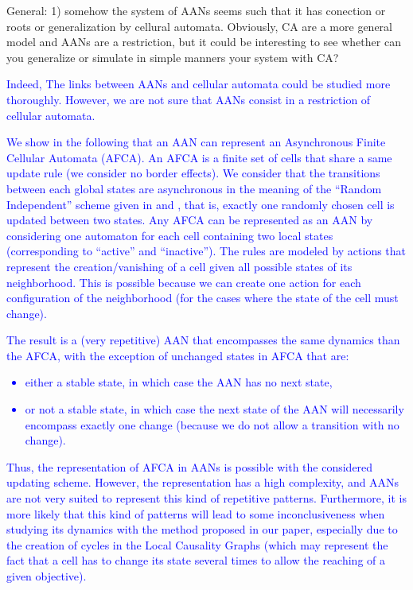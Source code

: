\documentclass[11pt]{article}
\newcommand{\ilanswer}[1]{\textcolor{blue}{#1}}
\begin{document}
General: 1) somehow the system of AANs seems such that it has conection or roots or generalization by cellural automata. Obviously, CA are a more general model and AANs are a restriction, but it could be interesting to see whether can you generalize or simulate in simple manners your system with CA?

\ilanswer{Indeed, The links between AANs and cellular automata could be studied more thoroughly.
However, we are not sure that AANs consist in a restriction of cellular automata.}

\ilanswer{We show in the following that an AAN can represent an Asynchronous Finite Cellular Automata (AFCA).
An AFCA is a finite set of cells that share a same update rule (we consider no border effects).
We consider that the transitions between each global states are asynchronous in the meaning of the “Random Independent” scheme given in \cite{cornforth_artificial_2003} and \cite{harvey_time_1997},
that is, exactly one randomly chosen cell is updated between two states.
Any AFCA can be represented as an AAN by considering one automaton for each cell containing two local states (corresponding to “active” and “inactive”).
The rules are modeled by actions that represent the creation/vanishing of a cell given all possible states of its neighborhood.
This is possible because we can create one action for each configuration of the neighborhood (for the cases where the state of the cell must change).}

\ilanswer{The result is a (very repetitive) AAN that encompasses the same dynamics than the AFCA,
with the exception of unchanged states in AFCA that are:
\begin{itemize}
  \item either a stable state, in which case the AAN has no next state,
  \item or not a stable state, in which case the next state of the AAN will necessarily
    encompass exactly one change (because we do not allow a transition with no change).
\end{itemize}}

\ilanswer{Thus, the representation of AFCA in AANs is possible with the considered updating scheme.
However, the representation has a high complexity, and AANs are not very suited to represent this kind of repetitive patterns.
Furthermore, it is more likely that this kind of patterns will lead to some inconclusiveness
when studying its dynamics with the method proposed in our paper,
especially due to the creation of cycles in the Local Causality Graphs
(which may represent the fact that a cell has to change its state several times to allow the reaching of a given objective).}
\end{document}
